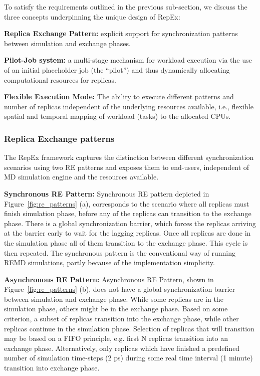 \documentclass{sig-alternate-05-2015}
\begin{document}
To satisfy the requirements outlined in the previous sub-section, we discuss the three concepts underpinning the unique design of RepEx: 
\begin{compactitem}
  \item \textbf{Replica Exchange Pattern:} explicit support for synchronization patterns between simulation and exchange phases.
  \item \textbf{Pilot-Job system:} a multi-stage mechanism for workload execution via the use of an initial placeholder job (the ``pilot'') and thus dynamically allocating computational resources for replicas.
  \item \textbf{Flexible Execution Mode:} The ability to execute different patterns and number of replicas independent of the underlying resources available, i.e., flexible spatial and temporal mapping of workload (tasks) to the allocated CPUs.
\end{compactitem}

\subsubsection{Replica Exchange patterns} \label{re.patterns}
 
The RepEx framework captures the distinction between different synchronization scenarios using two RE patterns and exposes them to end-users, independent of MD simulation engine and the resources available.

{\bf Synchronous RE Pattern:} Synchronous RE pattern depicted in Figure~\ref{fig:re_patterns} (a), corresponds to the scenario where all replicas must finish simulation phase, before any of the replicas can transition to the exchange phase. There is a global synchronization barrier, which forces the replicas arriving at the barrier early to wait for the lagging replicas. Once all replicas are done in the simulation phase all of them transition to the exchange phase. This cycle is then repeated. The synchronous pattern is the conventional way of running REMD simulations, partly because of the implementation simplicity.

{\bf Asynchronous RE Pattern:} Asynchronous RE Pattern, shown in Figure~\ref{fig:re_patterns} (b), does not have a global synchronization barrier between simulation and exchange phase. While some replicas are in the simulation phase, others might be in the exchange phase. Based on some criterion, a subset of replicas transition into the exchange phase, while other replicas continue in the simulation phase. Selection of replicas that will transition may be based on a FIFO principle, e.g. first N replicas transition into an exchange phase. Alternatively, only replicas which have finished a predefined number of simulation time-steps (2 ps) during some real time interval (1 minute) transition into exchange phase.
\end{document}
